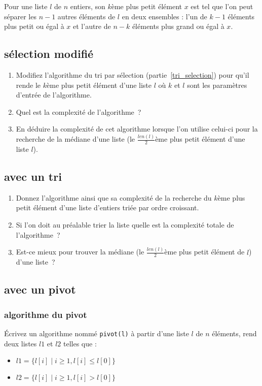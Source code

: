\documentclass
[12pt]
{article}
\begin{document}
Pour une liste $l$ de $n$ entiers, son $k$ème plus petit élément $x$ est tel que l'on peut séparer les $n-1$ autres éléments de $l$ en deux ensembles : l'un de $k-1$ éléments plus petit ou égal à $x$ et l'autre de $n-k$ éléments plus grand ou égal à $x$.


\subsection{sélection modifié}

\begin{enumerate}
  \item Modifiez l'algorithme du tri par sélection (partie~\ref{tri_selection}) pour qu'il rende le $k$ème plus petit élément d'une liste $l$ où $k$ et $l$ sont les paramètres d'entrée de l'algorithme. 
  \item Quel est la complexité de l'algorithme~?
  \item En déduire la complexité de cet algorithme lorsque l'on utilise celui-ci pour la recherche de la médiane d'une liste (le $\frac{len(l)}{2}$ème plus petit élément d'une liste $l$).
\end{enumerate}

\subsection{avec un tri}

\begin{enumerate}
  \item Donnez l'algorithme ainsi que sa complexité de la recherche du $k$ème plus petit élément d'une liste d'entiers triée par ordre croissant.
  \item Si l'on doit au préalable trier la liste quelle est la complexité totale de l'algorithme~? 
  \item Est-ce mieux pour trouver la médiane (le $\frac{len(l)}{2}$ème plus petit élément de $l$) d'une liste~?
\end{enumerate}


\subsection{avec un pivot}

\subsubsection{algorithme du pivot}

Écrivez un algorithme nommé {\tt pivot(l)} à partir d'une liste $l$ de $n$ éléments, rend deux listes $l1$ et $l2$ telles que : 
\begin{itemize}
  \item $l1 = \{ l[i]  \mid  i \geq 1, l[i] \leq l[0] \}$ 
  \item $l2 = \{ l[i] \mid i \geq 1, l[i] > l[0] \}$
\end{itemize}  
\end{document}
